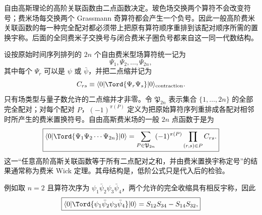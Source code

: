 自由高斯理论的高阶关联函数由二点函数决定。玻色场交换两个算符不会改变符号；费米场每交换两个 Grassmann 奇算符都会产生一个负号。因此一般高阶费米关联函数的每一种完全配对都必须带上把原有算符顺序重排到该配对顺序所需的置换宇称。后面的全同费米子交换号与闭合费米子圈负号都来自这一同一代数结构。


设按原始时间序列排列的 $2n$ 个自由费米型场算符统一记为
\[
\Psi_1,\Psi_2,\ldots,\Psi_{2n},
\]
其中每个 $\Psi_r$ 可以是 $\psi$ 或 $\bar\psi$，并把二点缩并记为
\begin{equation}
 C_{rs}\equiv
 \langle0|\Tord\{\Psi_r\Psi_s\}|0\rangle_{\rm contraction}.
 \label{eq:generic-fermion-contraction-dp8}
\end{equation}
只有场类型与量子数允许的二点缩并才非零。令 $\mathfrak P_{2n}$ 表示集合 $\{1,\ldots,2n\}$ 的全部完全配对；对每个配对 $P$，$(-1)^{\pi(P)}$ 定义为把原始算符序列重排成各配对相邻时所产生的费米置换符号。自由高斯费米场的一般 $2n$ 点函数于是为
\begin{equation}
 \boxed{
 \langle0|\Tord\{\Psi_1\Psi_2\cdots\Psi_{2n}\}|0\rangle
 =\sum_{P\in\mathfrak P_{2n}}
 (-1)^{\pi(P)}
 \prod_{(r,s)\in P} C_{rs}.}
 \label{eq:fermion-wick-general-dp73}
\end{equation}
这一“任意高阶高斯关联函数等于所有二点配对之和，并由费米置换宇称定号”的结果通常称为费米 Wick 定理。其母结构是，低阶公式只是代入后的检验。

例如取 $n=2$ 且算符次序为 $\psi_1\bar\psi_2\psi_3\bar\psi_4$，两个允许的完全收缩具有相反宇称，因此
\begin{equation}
 \boxed{
 \langle0|\Tord\{\psi_1\bar\psi_2\psi_3\bar\psi_4\}|0\rangle
 =S_{12}S_{34}-S_{14}S_{32},}
 \label{eq:fermion-wick-four-r68}
\end{equation}

